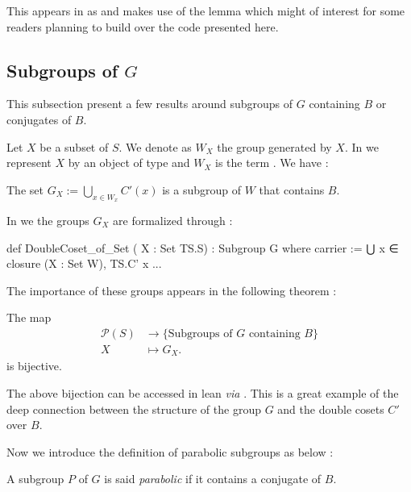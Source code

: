 This appears in \Lean as  and makes use of the lemma  which might of interest for some readers planning to build over the code presented here.

\subsection{Subgroups of $G$}

This subsection present a few results around subgroups of $G$ containing $B$ or conjugates of $B$.

Let $X$ be a subset of $S$. We denote as $W_X$ the group generated by $X$. In \Lean  we represent $X$ by an object  of type  and $W_X$ is the term . We have :
\begin{theoreme} 
    The set $G_X := \bigcup_{x \in W_x} C'\left( x \right)$ is a subgroup of $W$ that contains $B$.
\end{theoreme}

In \Lean we the groups $G_X$ are formalized through :

\begin{leancode}
def DoubleCoset_of_Set ( X : Set TS.S) : Subgroup G where
  carrier := ⋃ x ∈ closure (X : Set W), TS.C' x
  ...
\end{leancode}

The importance of these groups appears in the following theorem :

\begin{theoreme} \label{thm:GX}
     
    The map \vspace{-0.2cm}
\begin{align*}
\mathcal{P}\left( S \right) &\longrightarrow \{\text{Subgroups of $G$ containing $B$}\} \\
X &\longmapsto G_X 
.\end{align*}
    is bijective. 
\end{theoreme}

The above bijection can be accessed in lean \textit{via}  . This is a great example of the deep connection between the structure of the group $G$ and the double cosets $C'$ over $B$.

Now we introduce the definition of parabolic subgroups as below :

\begin{definition}
    A subgroup $P$ of $G$ is said \emph{parabolic} if it contains a conjugate of $B$.
\end{definition}

